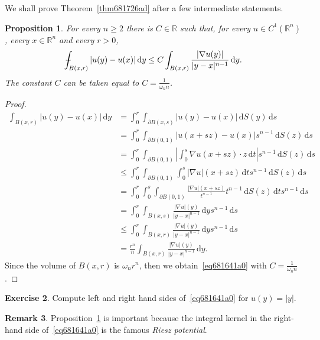 \documentclass[a4paper,9pt]{amsart}
\newcommand{\R}{\mathbb{R}}	%
\newcommand{\did}{\,\mathrm{d}}	%
\newcommand{\de}{\partial}		%
\newcommand{\grad}{\nabla}
\def\Xint#1{\mathchoice
      {\XXint\displaystyle\textstyle{#1}}%
      {\XXint\textstyle\scriptstyle{#1}}%
      {\XXint\scriptstyle\scriptscriptstyle{#1}}%
      {\XXint\scriptscriptstyle\scriptscriptstyle{#1}}%
      \!\int}
\def\XXint#1#2#3{{\setbox0=\hbox{$#1{#2#3}{\int}$}
        \vcenter{\hbox{$#2#3$}}\kern-.5\wd0}}
\def\fint{\Xint-}
\theoremstyle{plain}
\newtheorem{proposition}{Proposition}[section]
\theoremstyle{definition}
\newtheorem{remark}[proposition]{Remark}
\newtheorem{exercise}[proposition]{Exercise}%
\theoremstyle{remark}
\begin{document}
We shall prove Theorem~\ref{thm681726ad} after a few intermediate statements.

\begin{proposition}\label{prop6816457e}
	For every $n\ge 2$ there is $C\in\R$ such that, for every $u\in C^1(\R^n)$, every $x\in\R^n$ and every $r>0$, 
	\begin{equation}\label{eq681641a0}
		\fint_{B(x,r)} |u(y)-u(x)| \did y 
		\le C \int_{B(x,r)} \frac{ |\grad u(y)| }{ |y-x|^{n-1} } \did y .
	\end{equation}
	The constant $C$ can be taken equal to $C=\frac{1}{\omega_n n}$.
\end{proposition}
\begin{proof}
	\begin{align*}
	\int_{B(x,r)} |u(y)-u(x)|\did y
	&= \int_0^r \int_{\de B(x,s)} |u(y)-u(x)| \did S(y) \did s \\
	&= \int_0^r \int_{\de B(0,1)} |u(x+sz)-u(x)| s^{n-1}\did S(z) \did s \\
	&= \int_0^r \int_{\de B(0,1)} \left| \int_0^s \grad u(x+sz)\cdot z \did t \right| s^{n-1}\did S(z) \did s \\
	&\le \int_0^r \int_{\de B(0,1)}  \int_0^s |\grad u|(x+sz) \did t s^{n-1}\did S(z) \did s \\
	&= \int_0^r  \int_0^s \int_{\de B(0,1)} \frac{|\grad u|(x+sz)}{t^{n-1}} t^{n-1} \did S(z) \did t s^{n-1} \did s \\
	&= \int_0^r  \int_{B(x,s)} \frac{|\grad u|(y)}{|y-x|^{n-1}} \did y s^{n-1} \did s \\
	&\le \int_0^r  \int_{B(x,r)} \frac{|\grad u|(y)}{|y-x|^{n-1}} \did y s^{n-1} \did s \\
	&= \frac{r^n}{n} \int_{B(x,r)} \frac{|\grad u|(y)}{|y-x|^{n-1}} \did y  .
	\end{align*}
	Since the volume of $B(x,r)$ is $\omega_nr^n$, then we obtain~\eqref{eq681641a0} with $C=\frac{1}{\omega_n n}$. 
\end{proof}

\begin{exercise}
	Compute left and right hand sides of~\eqref{eq681641a0} for $u(y)=|y|$.
\end{exercise}

\begin{remark}
	Proposition~\ref{prop6816457e} is important because the integral kernel in the right-hand side of~\eqref{eq681641a0} is the famous \emph{Riesz potential}.
\end{remark}
\end{document}
